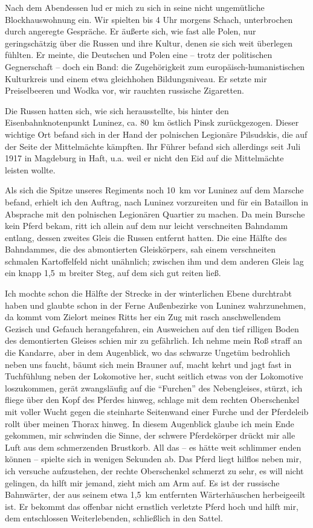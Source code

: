 Nach dem Abendessen lud er mich zu sich in seine nicht ungemütliche Blockhauswohnung ein. Wir spielten bis 4 Uhr morgens Schach, unterbrochen durch angeregte Gespräche. Er äußerte sich, wie fast alle Polen, nur geringschätzig über die Russen und ihre Kultur, denen sie sich weit überlegen fühlten. Er meinte, die Deutschen und Polen eine -- trotz der politischen Gegnerschaft -- doch ein Band: die Zugehörigkeit zum europäisch-humanistischen Kulturkreis und einem etwa gleichhohen Bildungsniveau. Er setzte mir Preiselbeeren und Wodka vor, wir rauchten russische Zigaretten.

Die Russen hatten sich, wie sich herausstellte, bis hinter den Eisenbahnknotenpunkt Luninez, ca. 80~km östlich Pinsk zurückgezogen. Dieser wichtige Ort befand sich in der Hand der polnischen Legionäre Pilsudskis, die auf der Seite der Mittelmächte kämpften. Ihr Führer befand sich allerdings seit Juli 1917 in Magdeburg in Haft, u.a. weil er nicht den Eid auf die Mittelmächte leisten wollte.

Als sich die Spitze unseres Regiments noch 10~km vor Luninez auf dem Marsche befand, erhielt ich den Auftrag, nach Luninez vorzureiten und für ein Bataillon in Absprache mit den polnischen Legionären Quartier zu machen. Da mein Bursche kein Pferd bekam, ritt ich allein auf dem nur leicht verschneiten Bahndamm entlang, dessen zweites Gleis die Russen entfernt hatten. Die eine Hälfte des Bahndammes, die des abmontierten Gleiskörpers, sah einem verschneiten schmalen Kartoffelfeld nicht unähnlich; zwischen ihm und dem anderen Gleis lag ein knapp 1,5~m breiter Steg, auf dem sich gut reiten ließ.

Ich mochte schon die Hälfte der Strecke in der winterlichen Ebene durchtrabt haben und glaubte schon in der Ferne Außenbezirke von Luninez wahrzunehmen, da kommt vom Zielort meines Ritts her ein Zug mit rasch anschwellendem Gezisch und Gefauch herangefahren, ein Ausweichen auf den tief rilligen Boden des demontierten Gleises schien mir zu gefährlich. Ich nehme mein Roß straff an die Kandarre, aber in dem Augenblick, wo das schwarze Ungetüm bedrohlich neben uns faucht, bäumt sich mein Brauner auf, macht kehrt und jagt fast in Tuchfühlung neben der Lokomotive her, sucht seitlich etwas von der Lokomotive loszukommen, gerät zwangsläufig auf die \enquote{Furchen} des Nebengleises, stürzt, ich fliege über den Kopf des Pferdes hinweg, schlage mit dem rechten Oberschenkel mit voller Wucht gegen die steinharte Seitenwand einer Furche und der Pferdeleib rollt über meinen Thorax hinweg. In diesem Augenblick glaube ich mein Ende gekommen, mir schwinden die Sinne, der schwere Pferdekörper drückt mir alle Luft aus dem schmerzenden Brustkorb. All das -- es hätte weit schlimmer enden können -- spielte sich in wenigen Sekunden ab. Das Pferd liegt hilflos neben mir, ich versuche aufzustehen, der rechte Oberschenkel schmerzt zu sehr, es will nicht gelingen, da hilft mir jemand, zieht mich am Arm auf. Es ist der russische Bahnwärter, der aus seinem etwa 1,5~km entfernten Wärterhäuschen herbeigeeilt ist. Er bekommt das offenbar nicht ernstlich verletzte Pferd hoch und hilft mir, dem entschlossen Weiterlebenden, schließlich in den Sattel.

